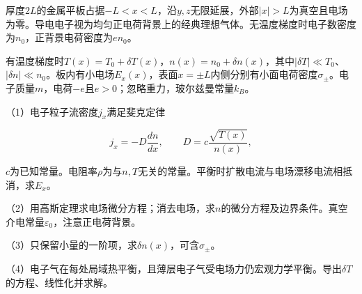 \documentclass[12pt,a4paper,fontset=fandol]{ctexart}
\begin{document}
厚度\(2L\)的金属平板占据\(-L<x<L\)，沿\(y,z\)无限延展，外部\(|x|>L\)为真空且电场为零。导电电子视为均匀正电荷背景上的经典理想气体。无温度梯度时电子数密度为\(n_0\)，正背景电荷密度为\(en_0\)。

有温度梯度时\(T(x)=T_0+\delta T(x)\)，\(n(x)=n_0+\delta n(x)\)，其中\(|\delta T|\ll T_0\)、\(|\delta n|\ll n_0\)。板内有小电场\(E_x(x)\)，表面\(x=\pm L\)内侧分别有小面电荷密度\(\sigma_\pm\)。电子质量\(m\)，电荷\(-e\)且\(e>0\)；忽略重力，玻尔兹曼常量\(k_B\)。

\begin{center}
\begin{minipage}{\linewidth}
\centering\begingroup{}
\ifdim\wd\diagrambox>.88\linewidth
\sbox{\diagrambox}{\resizebox{.88\linewidth}{!}{\usebox{\diagrambox}}}\fi
\ifdim\ht\diagrambox>.38\textheight
\resizebox{!}{.38\textheight}{\usebox{\diagrambox}}
\else\usebox{\diagrambox}\fi
\par{}\endgroup\end{minipage}\end{center}

（1）电子粒子流密度\(j_x\)满足斐克定律

\[
j_x=-D\frac{dn}{dx},\qquad
D=c\frac{\sqrt{T(x)}}{n(x)},
\]

\(c\)为已知常量。电阻率\(\rho\)为与\(n,T\)无关的常量。平衡时扩散电流与电场漂移电流相抵消，求\(E_x\)。

（2）用高斯定理求电场微分方程；消去电场，求\(n\)的微分方程及边界条件。真空介电常量\(\varepsilon_0\)，注意正电荷背景。

（3）只保留小量的一阶项，求\(\delta n(x)\)，可含\(\sigma_\pm\)。

（4）电子气在每处局域热平衡，且薄层电子气受电场力仍宏观力学平衡。导出\(\delta T\)的方程、线性化并求解。
\end{document}
